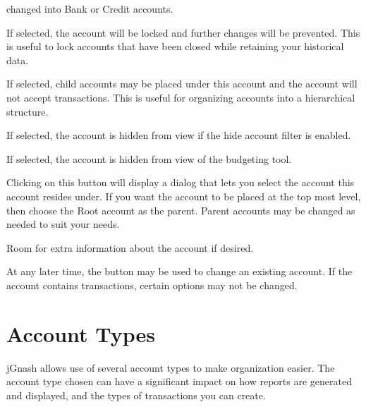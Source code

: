 \documentclass[letterpaper,12pt]{book}
\begin{document}
\begin{description}[style=nextline]
        changed into Bank or Credit accounts.
        \item[Account Options:Locked]
        If selected, the account will be locked and further changes will be prevented.
        This is useful to lock accounts that have been closed while retaining your historical data.
        \item[Account Options:Placeholder]
        If selected, child accounts may be placed under this account and the account will not accept transactions.
        This is useful for organizing accounts into a hierarchical structure.
        \item[Account Options:Hide Account]
        If selected, the account is hidden from view if the hide account filter is enabled.
        \item[Account Options:Exclude From Budgets]
        If selected, the account is hidden from view of the budgeting tool.
        \item[Parent Account]
        Clicking on this button will display a dialog that lets you select the account this account resides under.
        If you want the account to be placed at the top most level, then choose the Root account as the parent.
        Parent accounts may be changed as needed to suit your needs.
        \item[Notes]
        Room for extra information about the account if desired.
    \end{description}

    At any later time, the  button may be used to change an existing account.
    If the account contains transactions, certain options may not be changed.



    \section{Account Types}
    jGnash allows use of several account types to make organization easier.
    The account type chosen can have a significant impact on how reports are generated and displayed, and the types
    of transactions you can create.
\end{document}
